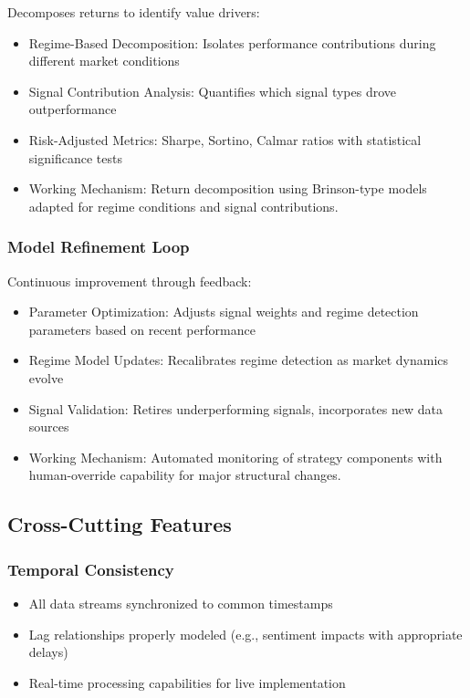 \documentclass{singlecol-new}
\theoremstyle{TH}{
\newtheorem{lemma}{Lemma}
\newtheorem{theorem}[lemma]{Theorem}
\newtheorem{corrolary}[lemma]{Corrolary}
\newtheorem{conjecture}[lemma]{Conjecture}
\newtheorem{proposition}[lemma]{Proposition}
\newtheorem{claim}[lemma]{Claim}
\newtheorem{stheorem}[lemma]{Wrong Theorem}
\newtheorem{algorithm}{Algorithm}
}
\theoremstyle{THrm}{
\newtheorem{definition}{Definition}[section]
\newtheorem{question}{Question}[section]
\newtheorem{remark}{Remark}
\newtheorem{scheme}{Scheme}
}
\theoremstyle{THhit}{
\newtheorem{case}{Case}[section]
}
\begin{document}
Decomposes returns to identify value drivers:
\begin{itemize}
    \item Regime-Based Decomposition: Isolates performance contributions during different market conditions
    \item Signal Contribution Analysis: Quantifies which signal types drove outperformance
    \item Risk-Adjusted Metrics: Sharpe, Sortino, Calmar ratios with statistical significance tests
    \item Working Mechanism: Return decomposition using Brinson-type models adapted for regime conditions and signal contributions.
\end{itemize}

\subsubsection{Model Refinement Loop}

Continuous improvement through feedback:
\begin{itemize}
    \item Parameter Optimization: Adjusts signal weights and regime detection parameters based on recent performance
    \item Regime Model Updates: Recalibrates regime detection as market dynamics evolve
    \item Signal Validation: Retires underperforming signals, incorporates new data sources
    \item Working Mechanism: Automated monitoring of strategy components with human-override capability for major structural changes.
\end{itemize}


\subsection{Cross-Cutting Features}
\subsubsection{Temporal Consistency}
\begin{itemize}
    \item All data streams synchronized to common timestamps
    \item Lag relationships properly modeled (e.g., sentiment impacts with appropriate delays)
    \item Real-time processing capabilities for live implementation
\end{itemize}
\end{document}

